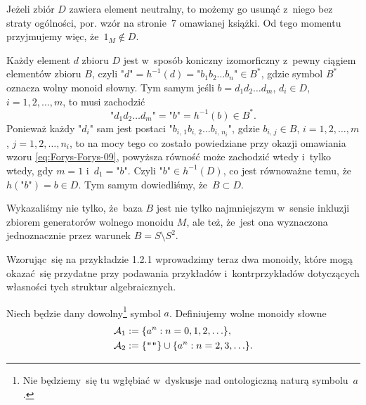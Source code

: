 \documentclass[a4paper,11pt]{article}
\begin{document}
Jeżeli zbiór $D$ zawiera element neutralny, to możemy go usunąć
z~niego bez straty ogólności, por. wzór na stronie~7 omawianej
książki. Od tego momentu przyjmujemy więc, że~$1_{ M } \notin D$.

Każdy element $d$ zbioru $D$ jest w~sposób koniczny izomorficzny
z~pewny ciągiem elementów zbioru $B$, czyli
$\texttt{"} d \texttt{"} = h^{ -1 }( d ) = \texttt{"} b_{ 1 } b_{ 2 }
\ldots b_{ n } \texttt{"} \in B^{ * }$, gdzie symbol $B^{ * }$ oznacza
wolny monoid słowny. Tym samym jeśli
$b = d_{ 1 } d_{ 2 } \ldots d_{ m }$, $d_{ i } \in D$,
$i = 1, 2, \ldots, m$, to musi zachodzić
\begin{equation}
  \label{eq:Forys-Forys-34}
  \texttt{"} d_{ 1 } d_{ 2 } \ldots d_{ m } \texttt{"} =
  \texttt{"} b \texttt{"} = h^{ -1 }( b ) \in B^{ * }.
\end{equation}
Ponieważ każdy $\texttt{"} d_{ i } \texttt{"}$ sam jest postaci
$\texttt{"} b_{ i,\, 1 } b_{ i,\, 2 } \ldots b_{ i,\, n_{ i } }
\texttt{"}$, gdzie $b_{ i,\, j } \in B$, $i = 1, 2, \ldots, m$,
$j = 1, 2, \ldots, n_{ i }$, to na mocy tego co zostało powiedziane przy
okazji omawiania wzoru \eqref{eq:Forys-Forys-09}, powyższa równość
może zachodzić wtedy i~tylko wtedy, gdy $m = 1$
i~$d_{ 1 } = \texttt{"} b \texttt{"}$. Czyli
$\texttt{"} b \texttt{"} \in h^{ -1 }( D )$, co jest równoważne temu,
że~$h( \texttt{"} b \texttt{"} ) = b \in D$. Tym samym dowiedliśmy,
że~$B \subset D$.

Wykazaliśmy nie tylko, że~baza $B$ jest nie tylko najmniejszym
w~sensie inkluzji zbiorem generatorów wolnego monoidu $M$, ale też,
że~jest ona wyznaczona jednoznacznie przez warunek $B = S \setminus S^{ 2 }$.

\vspace{\spaceFour}





\start {} Wzorując~się na przykładzie 1.2.1 wprowadzimy teraz
dwa monoidy, które mogą okazać~się przydatne przy podawania przykładów
i~kontrprzykładów dotyczących własności tych struktur algebraicznych.

Niech będzie dany dowolny\footnote{Nie będziemy~się tu wgłębiać
  w~dyskusje nad ontologiczną naturą symbolu~$a$.} symbol $a$.
Definiujemy wolne monoidy słowne
\begin{subequations}
  \begin{align}
    \label{eq:Forys-Forys-35-A}
    \mathcal{A}_{ 1 } &:= \{ a^{ n } : n = 0, 1, 2, \ldots \}, \\
    \label{eq:Forys-Forys-35-B}
    \mathcal{A}_{ 2 } &:= \{ \texttt{""} \} \cup \{ a^{ n } : n = 2, 3, \ldots \}.
  \end{align}
\end{subequations}
\end{document}
